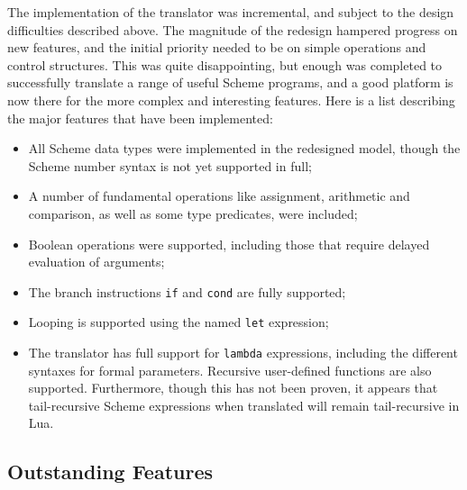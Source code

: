 The implementation of the translator was incremental, and subject to the design
difficulties described above. The magnitude of the redesign hampered progress on
new features, and the initial priority needed to be on simple operations and
control structures. This was quite disappointing, but enough was completed to
successfully translate a range of useful Scheme programs, and a good platform is
now there for the more complex and interesting features. Here is a list
describing the major features that have been implemented:
\begin{itemize}
\item All Scheme data types were implemented in the redesigned model, though the
Scheme number syntax is not yet supported in full;
\item A number of fundamental operations like assignment, arithmetic and
comparison, as well as some type predicates, were included;
\item Boolean operations were supported, including those that require delayed
evaluation of arguments;
\item The branch instructions \texttt{if} and \texttt{cond} are fully supported;
\item Looping is supported using the named \texttt{let} expression;
\item The translator has full support for \texttt{lambda} expressions, including
the different syntaxes for formal parameters. Recursive user-defined functions
are also supported. Furthermore, though this has not been proven, it appears
that tail-recursive Scheme expressions when translated will remain
tail-recursive in Lua.
\end{itemize}

\subsection{Outstanding Features}

